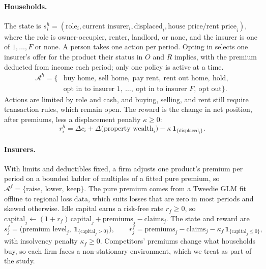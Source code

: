 \documentclass[10pt]{article}
\begin{document}
\paragraph{Households.} The state is $s^{h}_i=(\text{role}_i,\text{current insurer}_i,\text{displaced}_i, \text{house price/rent price}_i)$, where the role is owner-occupier, renter, landlord, or none, and the insurer is one of $1,\ldots,F$ or none. A person takes one action per period. Opting in selects one insurer's offer for the product their status in $O$ and $R$ implies, with the premium deducted from income each period; only one policy is active at a time.
\begin{equation}
\begin{aligned}
 \mathcal{A}^{h}=\{&\text{buy home},\ \text{sell home},\ \text{pay rent},\ \text{rent out home},\ \text{hold},\\
 &\text{opt in to insurer }1,\ \ldots,\ \text{opt in to insurer }F,\ \text{opt out}\}.
\end{aligned}
\end{equation}
Actions are limited by role and cash, and buying, selling, and rent still require transaction rules, which remain open. The reward is the change in net position, after premiums, less a displacement penalty $\kappa\ge0$:
\begin{equation}
 r^{h}_i=\Delta c_i+\Delta\big(\text{property wealth}_i\big)-\kappa\,\mathbf{1}_{\{\text{displaced}_i\}}.
\end{equation}

\paragraph{Insurers.} With limits and deductibles fixed, a firm adjusts one product's premium per period on a bounded ladder of multiples of a fitted pure premium, so $\mathcal{A}^{f}=\{\text{raise},\ \text{lower},\ \text{keep}\}$. The pure premium comes from a Tweedie GLM fit offline to regional loss data, which suits losses that are zero in most periods and skewed otherwise. Idle capital earns a risk-free rate $r_f\ge0$, so $\text{capital}_j\gets(1+r_f)\,\text{capital}_j+\text{premiums}_j-\text{claims}_j$. The state and reward are
\begin{equation}
 s^{f}_j=\big(\text{premium level}_j,\ \mathbf{1}_{\{\text{capital}_j>0\}}\big),
 \qquad
 r^{f}_j=\text{premiums}_j-\text{claims}_j-\kappa_f\,\mathbf{1}_{\{\text{capital}_j\le0\}},
\end{equation}
with insolvency penalty $\kappa_f\ge0$. Competitors' premiums change what households buy, so each firm faces a non-stationary environment, which we treat as part of the study.
\end{document}
